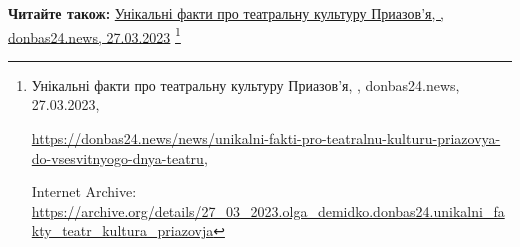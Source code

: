  
 
 
 
 

\def\pubIA{https://archive.org/details/27_03_2023.olga_demidko.donbas24.unikalni_fakty_teatr_kultura_priazovja}
\def\pubTitle{Унікальні факти про театральну культуру Приазов'я}
\def\pubDate{27.03.2023}
\def\pubOrigin{https://donbas24.news/news/unikalni-fakti-pro-teatralnu-kulturu-priazovya-do-vsesvitnyogo-dnya-teatru}
\def\pubAuthor{\pubAuthorDemidko}
\def\pubSite{donbas24.news}

\textbf{Читайте також:} \href{\pubIA}{%
\pubTitle, \pubAuthor, \pubSite, \pubDate}%
\footnote{\pubTitle, \pubAuthor, \pubSite, \pubDate, \par\url{\pubOrigin}, \par Internet Archive: \url{\pubIA}}
